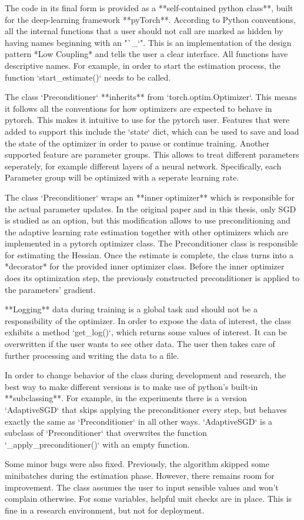 \documentclass[twoside,12pt,a4paper]{report}
\begin{document}
\begin{markdown}
The code in its final form is provided as a **self-contained python class**, built for the deep-learning framework **pyTorch**. According to Python conventions, all the internal functions that a user should not call are marked as hidden by having names beginning with an "`_`". This is an implementation of the design pattern *Low Coupling* and tells the user a clear interface. All functions have descriptive names. For example, in order to start the estimation process, the function `start_estimate()` needs to be called.

The class `Preconditioner` **inherits** from `torch.optim.Optimizer`. This means it follows all the conventions for how optimizers are expected to behave in pytorch. This makes it intuitive to use for the pytorch user. Features that were added to support this include the `state` dict, which can be used to save and load the state of the optimizer in order to pause or continue training. Another supported feature are parameter groups. This allows to treat different parameters seperately, for example different layers of a neural network. Specifically, each Parameter group will be optimized with a seperate learning rate.

The class `Preconditioner` wraps an **inner optimizer** which is responsible for the actual parameter updates. In the original paper and in this thesis, only SGD is studied as an option, but this modification allows to use preconditioning and the adaptive learning rate estimation together with other optimizers which are implemented in a pytorch optimizer class. The Preconditioner class is responsible for estimating the Hessian. Once the estimate is complete, the class turns into a *decorator* for the provided inner optimizer class. Before the inner optimizer does its optimization step, the previously constructed preconditioner is applied to the parameters' gradient.

**Logging** data during training is a global task and should not be a responsibility of the optimizer. In order to expose the data of interest, the class exhibits a method `get_log()`, which returns some values of interest. It can be overwritten if the user wants to see other data. The user then takes care of further processing and writing the data to a file.

In order to change behavior of the class during development and research, the best way to make different versions is to make use of python's built-in **subclassing**. For example, in the experiments there is a version `AdaptiveSGD` that skips applying the preconditioner every step, but behaves exactly the same as `Preconditioner` in all other ways. `AdaptiveSGD` is a subclass of `Preconditioner` that overwrites the function `_apply_preconditioner()` with an empty function.

Some minor bugs were also fixed. Previously, the algorithm skipped some minibatches during the estimation phase. However, there remains room for improvement. The class assumes the user to input sensible values and won't complain otherwise. For some variables, helpful unit checks are in place. This is fine in a research environment, but not for deployment.
\end{markdown}
\end{document}
